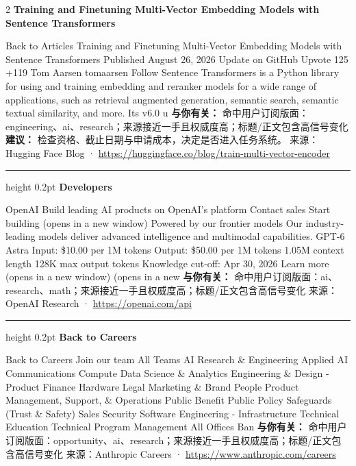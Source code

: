 \documentclass[10.5pt]{ctexart}
\begin{document}
\begin{multicols}{2}
{\large\bfseries Training and Finetuning Multi-Vector Embedding Models with Sentence Transformers}\par
Back to Articles Training and Finetuning Multi-Vector Embedding Models with Sentence Transformers Published August 26, 2026 Update on GitHub Upvote 125 +119 Tom Aarsen tomaarsen Follow Sentence Transformers is a Python library for using and training embedding and reranker models for a wide range of applications, such as retrieval augmented generation, semantic search, semantic textual similarity, and more. Its v6.0 u
\textbf{与你有关：} 命中用户订阅版面：engineering、ai、research；来源接近一手且权威度高；标题/正文包含高信号变化
\textbf{建议：} 检查资格、截止日期与申请成本，决定是否进入任务系统。
{\footnotesize\color{ormuted} 来源：Hugging Face Blog · \url{https://huggingface.co/blog/train-multi-vector-encoder}}
\vspace{2mm}
\hrule height 0.2pt
\vspace{2mm}
{\large\bfseries Developers}\par
OpenAI Build leading AI products on OpenAI’s platform Contact sales Start building (opens in a new window) Powered by our frontier models Our industry-leading models deliver advanced intelligence and multimodal capabilities. GPT-6 Astra Input: \$10.00 per 1M tokens Output: \$50.00 per 1M tokens 1.05M context length 128K max output tokens Knowledge cut-off: Apr 30, 2026 Learn more (opens in a new window) (opens in a new
\textbf{与你有关：} 命中用户订阅版面：ai、research、math；来源接近一手且权威度高；标题/正文包含高信号变化
{\footnotesize\color{ormuted} 来源：OpenAI Research · \url{https://openai.com/api}}
\vspace{2mm}
\hrule height 0.2pt
\vspace{2mm}
{\large\bfseries Back to Careers}\par
Back to Careers Join our team All Teams AI Research \& Engineering Applied AI Communications Compute Data Science \& Analytics Engineering \& Design - Product Finance Hardware Legal Marketing \& Brand People Product Management, Support, \& Operations Public Benefit Public Policy Safeguards (Trust \& Safety) Sales Security Software Engineering - Infrastructure Technical Education Technical Program Management All Offices Ban
\textbf{与你有关：} 命中用户订阅版面：opportunity、ai、research；来源接近一手且权威度高；标题/正文包含高信号变化
{\footnotesize\color{ormuted} 来源：Anthropic Careers · \url{https://www.anthropic.com/careers}}
\vspace{2mm}

\end{multicols}
\end{document}
